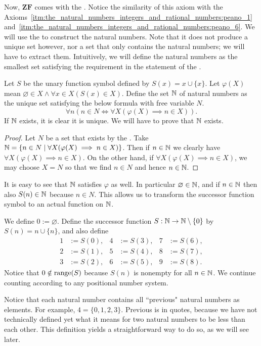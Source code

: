 \documentclass[../main.tex]{subfiles}
\begin{document}
Now, $\mathbf{ZF}$ comes with the . Notice the similarity of this axiom with the Axioms~\ref{itm:the_natural_numbers_integers_and_rational_numbers:peano_1}~and~\ref{itm:the_natural_numbers_integers_and_rational_numbers:peano_6}. We will use the  to construct the natural numbers. Note that it does not produce a unique set however, nor a set that only contains the natural numbers; we will have to extract them. Intuitively, we will define the natural numbers as the smallest set satisfying the requirement in the statement of the .
\begin{definition}\label{dfn:the_natural_numbers_integers_and_rational_numbers:natural_numbers}
    Let $S$ be the unary function symbol defined by $S(x)=x\cup\{x\}$. Let $\varphi(X)$ mean $\varnothing\in X\land\forall x\in X(S(x)\in X)$. Define the set $\mathbb{N}$ of natural numbers as the unique set satisfying the below formula with free variable $N$.
    \begin{equation*}
        \forall n(n\in N\iff\forall X(\varphi(X)\implies n\in X)).
    \end{equation*}
    If $\mathbb{N}$ exists, it is clear it is unique. We will have to prove that $\mathbb{N}$ exists.
\end{definition}
\begin{proof}
    Let $N$ be a set that exists by the . Take $\mathbb{N}=\{n\in N\mid\forall X(\varphi(X)\implies n\in X)\}$. Then if $n\in\mathbb{N}$ we clearly have $\forall X(\varphi(X)\implies n\in X)$. On the other hand, if $\forall X(\varphi(X)\implies n\in X)$, we may choose $X=N$ so that we find $n\in N$ and hence $n\in\mathbb{N}$.
\end{proof}
It is easy to see that $\mathbb{N}$ satisfies $\varphi$ as well. In particular $\varnothing\in\mathbb{N}$, and if $n\in\mathbb{N}$ then also $S(n)\in\mathbb{N}$ because $n\in N$. This allows us to transform the successor function symbol to an actual function on $\mathbb{N}$.
\begin{definition}
    We define $0:=\varnothing$. Define the successor function $S:\mathbb{N}\to\mathbb{N}\setminus\{0\}$ by $S(n)=n\cup\{n\}$, and also define
    \begin{align*}
        1 & :=S(0), & 4 & :=S(3), & 7 & :=S(6), \\
        2 & :=S(1), & 5 & :=S(4), & 8 & :=S(7), \\
        3 & :=S(2), & 6 & :=S(5), & 9 & :=S(8).
    \end{align*}
    Notice that $0\notin\operatorname{range}(S)$ because $S(n)$ is nonempty for all $n\in\mathbb{N}$. We continue counting according to any positional number system.
\end{definition}
Notice that each natural number contains all ``previous" natural numbers as elements. For example, $4=\{0,1,2,3\}$. Previous is in quotes, because we have not technically defined yet what it means for two natural numbers to be less than each other. This definition yields a straightforward way to do so, as we will see later.
\end{document}
